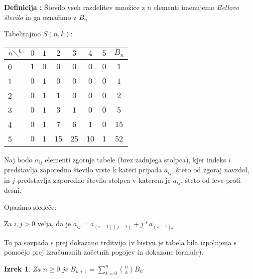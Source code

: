 \documentclass[a4paper, 10pt]{article}
\newtheorem{izr}{Izrek}
\newcounter{defcount}
\newenvironment{definicija}{\begin{flushleft}\stepcounter{defcount}\textbf{Definicija \arabic{defcount}:}}{\hfill\end{flushleft}}
\newcommand{\pojem}[1]{\emph{#1}}
\begin{document}
\begin{definicija}
Število vseh razdelitev množice z $n$ elementi imenujemo \pojem{Bellovo število} in ga označimo z $B_n$
\end{definicija}
Tabelirajmo $S(n, k)$:
\begin{table}[!h]
\centering
\begin{tabular}{l | cccccc | c}
$n \diagdown^k$ & $0$ & $1$ & $2$ & $3$ & $4$ & $5$ & $B_n$ \\ \midrule
0 & $1$ & $0$ & $0$ & $0$ & $0$ & $0$ & $1$ \\
1 & $0$ & $1$ & $0$ & $0$ & $0$ & $0$ & $1$ \\
2 & $0$ & $1$ & $1$ & $0$ & $0$ & $0$ & $2$ \\
3 & $0$ & $1$ & $3$ & $1$ & $0$ & $0$ & $5$ \\
4 & $0$ & $1$ & $7$ & $6$ & $1$ & $0$ & $15$ \\
5 & $0$ & $1$ & $15$ & $25$ & $10$ & $1$ & $52$ \\
\end{tabular}
\end{table}

Naj bodo $a_{ij}$ elementi zgornje tabele (brez zadnjega stolpca), kjer indeks $i$ predstavlja zaporedno število vrste k kateri pripada $a_{ij}$, šteto od zgoraj navzdol, in $j$ predstavlja zaporedno število stolpca v katerem je $a_{ij}$, šteto od leve proti desni. 

Opazimo sledeče:

Za $i, j > 0$ velja, da je $a_{ij} = a_{(i - 1)(j - 1)} + j * a_{(i-1)j}$

To pa sovpada s prej dokazano trditvijo (v bistvu je tabela bila izpolnjena s pomoćjo prej izračunanih začetnih pogojev in dokazane formule).

\begin{izr}
Za $n \geq 0$ je $B_{n + 1} = \sum_{k = 0}^{n}{\binom{n}{k} B_k}$
\end{izr}
\end{document}
